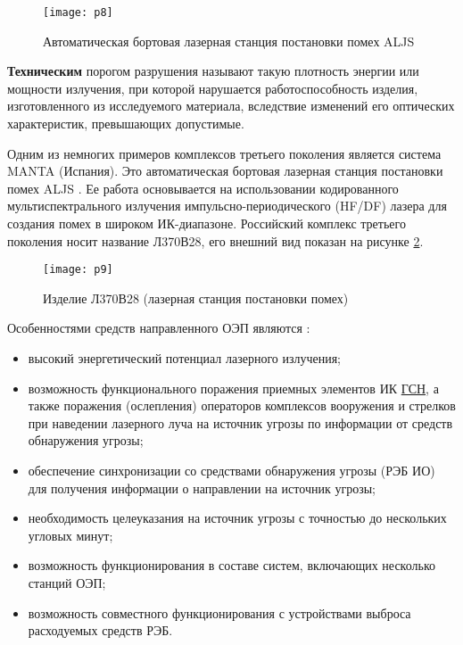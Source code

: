 \begin{figure}[ht]
	\centering
	\texttt{[image: p8]} 
	\caption{Автоматическая бортовая лазерная станция постановки помех ALJS}
	\label{fig:p8}
\end{figure}

\textbf{Техническим} порогом разрушения называют такую плотность энергии или мощности излучения, при которой нарушается работоспособность изделия, изготовленного из исследуемого материала, вследствие изменений его оптических характеристик, превышающих допустимые.

Одним из немногих примеров комплексов третьего поколения является система MANTA (Испания). Это автоматическая бортовая лазерная станция постановки помех ALJS \cite[]{manta}.
Ее работа основывается на использовании кодированного мультиспектрального излучения импульсно-периодического (HF/DF) лазера для создания помех в широком ИК-диапазоне.
Российский комплекс третьего поколения носит название Л370В28, его внешний вид показан на рисунке \ref{fig:p9}. 

\begin{figure}[ht]
	\centering
	\texttt{[image: p9]} 
	\caption{Изделие Л370В28 (лазерная станция постановки помех)}
	\label{fig:p9}
\end{figure}

Особенностями средств направленного ОЭП являются \cite[]{ForeignMilitary}:
\begin{itemize}
	\item высокий энергетический потенциал лазерного излучения;
	\item возможность функционального поражения приемных элементов ИК \hyperref[acroGSN]{ГСН}, а также поражения (ослепления) операторов комплексов вооружения и стрелков при наведении лазерного луча на источник угрозы по информации от средств обнаружения угрозы;
	\item обеспечение синхронизации со средствами обнаружения угрозы (РЭБ ИО) для получения информации о направлении на источник угрозы;
	\item необходимость целеуказания на источник угрозы с точностью до нескольких угловых минут;
	\item возможность функционирования в составе систем, включающих несколько станций ОЭП;
	\item возможность совместного функционирования с устройствами выброса расходуемых средств РЭБ.
\end{itemize}



